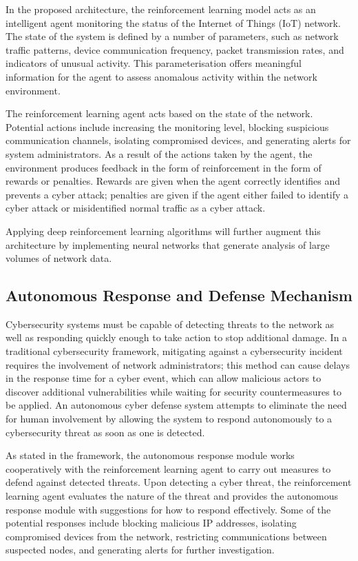 \documentclass[12pt]{article}
\begin{document}
In the proposed architecture, the reinforcement learning model acts as an intelligent agent monitoring the status of the Internet of Things (IoT) network. The state of the system is defined by a number of parameters, such as network traffic patterns, device communication frequency, packet transmission rates, and indicators of unusual activity. This parameterisation offers meaningful information for the agent to assess anomalous activity within the network environment.



The reinforcement learning agent acts based on the state of the network. Potential actions include increasing the monitoring level, blocking suspicious communication channels, isolating compromised devices, and generating alerts for system administrators. As a result of the actions taken by the agent, the environment produces feedback in the form of reinforcement in the form of rewards or penalties. Rewards are given when the agent correctly identifies and prevents a cyber attack; penalties are given if the agent either failed to identify a cyber attack or misidentified normal traffic as a cyber attack.



Applying deep reinforcement learning algorithms will further augment this architecture by implementing neural networks that generate analysis of large volumes of network data.\cite{Nguyen2023,Palmer2024,Jamshidi2025}
\subsection{Autonomous Response and Defense Mechanism}
Cybersecurity systems must be capable of detecting threats to the network as well as responding quickly enough to take action to stop additional damage. In a traditional cybersecurity framework, mitigating against a cybersecurity incident requires the involvement of network administrators; this method can cause delays in the response time for a cyber event, which can allow malicious actors to discover additional vulnerabilities while waiting for security countermeasures to be applied. An autonomous cyber defense system attempts to eliminate the need for human involvement by allowing the system to respond autonomously to a cybersecurity threat as soon as one is detected.





As stated in the framework, the autonomous response module works cooperatively with the reinforcement learning agent to carry out measures to defend against detected threats. Upon detecting a cyber threat, the reinforcement learning agent evaluates the nature of the threat and provides the autonomous response module with suggestions for how to respond effectively. Some of the potential responses include blocking malicious IP addresses, isolating compromised devices from the network, restricting communications between suspected nodes, and generating alerts for further investigation.
\end{document}
